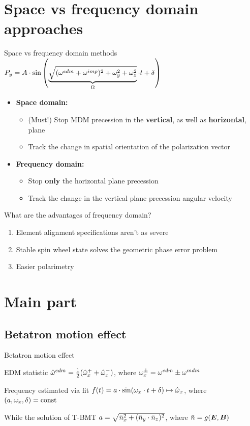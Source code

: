 \documentclass[14pt]{beamer}
\newcommand{\wedm}{\w^{edm}}
\newcommand{\wmdm}{\w^{mdm}}
\newcommand{\wimp}{\w^{imp}}
\begin{document}
\section{Space vs frequency domain approaches}
\begin{frame}{Space vs frequency domain methods}
	$P_y = A\cdot \sin\bkt{\underbrace{\sqrt{(\wedm + \wimp)^2 + \w_y^2 + \w_z^2}}_{\W}\cdot t + \delta}$
	\begin{itemize}
		\item \textbf{Space domain:}
		\begin{itemize}
			\item (Must!) Stop MDM precession in the \textbf{vertical}, as well as \textbf{horizontal}, plane
			\item Track the change in spatial orientation of the polarization vector
		\end{itemize}
		\item \textbf{Frequency domain:}
		\begin{itemize}
			\item Stop \textbf{only} the horizontal plane precession
			\item Track the change in the vertical plane precession angular velocity
		\end{itemize}
	\end{itemize}
\end{frame}

\begin{frame}{What are the advantages of frequency domain?}
	\begin{enumerate}
		\item Element alignment specifications aren't as severe
		\item Stable spin wheel state solves the geometric phase error problem
		\item Easier polarimetry
	\end{enumerate}
\end{frame}

\section{Main part}
\subsection{Betatron motion effect}
\begin{frame}{Betatron motion effect}
	\begin{block}{EDM statistic}
		$\hat\wedm = \frac12 (\hat\w_x^+ + \hat\w_x^-)$, where $\w_x^\pm = \wedm \pm\wmdm$
	\end{block}
	\begin{block}{Frequency estimated via fit}
		$f(t) = a\cdot\sin(\omega_x\cdot t + \delta)\mapsto \hat{\omega}_x$, where $(a, \omega_x, \delta) = \mathrm{const}$
	\end{block}
	\begin{block}{While the solution of T-BMT}
		$a = \sqrt{\bar n_x^2 + (\bar n_y\cdot \bar n_z)^2}$, where $\bar n = g(\boldsymbol E, \boldsymbol B)$
	\end{block}
\end{frame}
\end{document}
